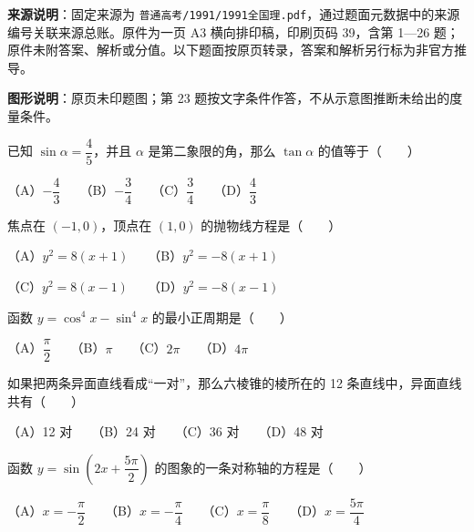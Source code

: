 


\begin{gktip}
\textbf{来源说明}：固定来源为 \texttt{普通高考/1991/1991全国理.pdf}，通过题面元数据中的来源编号关联来源总账。原件为一页 A3 横向排印稿，印刷页码 39，含第 1—26 题；原件未附答案、解析或分值。以下题面按原页转录，答案和解析另行标为非官方推导。

\textbf{图形说明}：原页未印题图；第 23 题按文字条件作答，不从示意图推断未给出的度量条件。
\end{gktip}

\begin{question}

已知 $\sin\alpha=\dfrac45$，并且 $\alpha$ 是第二象限的角，那么 $\tan\alpha$ 的值等于\mbox{（　　）}

（A）$-\dfrac43$　　（B）$-\dfrac34$　　（C）$\dfrac34$　　（D）$\dfrac43$

\end{question}
\begin{question}

焦点在 $(-1,0)$，顶点在 $(1,0)$ 的抛物线方程是\mbox{（　　）}

（A）$y^2=8(x+1)$　　（B）$y^2=-8(x+1)$

（C）$y^2=8(x-1)$　　（D）$y^2=-8(x-1)$

\end{question}
\begin{question}

函数 $y=\cos^4x-\sin^4x$ 的最小正周期是\mbox{（　　）}

（A）$\dfrac\pi2$　　（B）$\pi$　　（C）$2\pi$　　（D）$4\pi$

\end{question}
\begin{question}

如果把两条异面直线看成“一对”，那么六棱锥的棱所在的 12 条直线中，异面直线共有\mbox{（　　）}

（A）12 对　　（B）24 对　　（C）36 对　　（D）48 对

\end{question}
\begin{question}

函数 $y=\sin\left(2x+\dfrac{5\pi}{2}\right)$ 的图象的一条对称轴的方程是\mbox{（　　）}

（A）$x=-\dfrac\pi2$　　（B）$x=-\dfrac\pi4$　　（C）$x=\dfrac\pi8$　　（D）$x=\dfrac{5\pi}4$

\end{question}
